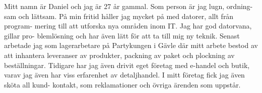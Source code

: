 

\begin{cvparagraph}

Mitt namn är Daniel och jag är 27 år gammal. Som person är jag lugn, ordning-
sam och lättsam. På min fritid håller jag mycket på med datorer, allt från program- mering till att utforska nya områden inom IT. Jag har god datorvana, gillar pro- blemlösning och har även lätt för att ta till mig ny teknik. Senast arbetade jag som lagerarbetare på Partykungen i Gävle där mitt arbete bestod av att inhantera leveranser av produkter, packning av paket och plockning av beställningar.
Tidigare har jag även drivit eget företag med e-handel och butik, varav jag även har viss erfarenhet av detaljhandel. I mitt företag fick jag även sköta all kund- kontakt, som reklamationer och övriga ärenden som uppstår.
\end{cvparagraph}
